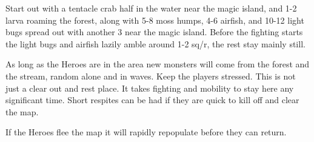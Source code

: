 Start out with a tentacle crab half in the water near the magic island, and 1-2 larva roaming the forest, along with 5-8 moss humps, 4-6 airfish, and 10-12 light bugs spread out with another 3 near the magic island.
Before the fighting starts the light bugs and airfish lazily amble around 1-2 sq/r, the rest stay mainly still.

As long as the Heroes are in the area new monsters will come from the forest and the stream, random alone and in waves. Keep the players stressed. This is not just a clear out and rest place. It takes fighting and mobility to stay here any significant time. Short respites can be had if they are quick to kill off and clear the map.

If the Heroes flee the map it will rapidly repopulate before they can return.


\raggedbottom
